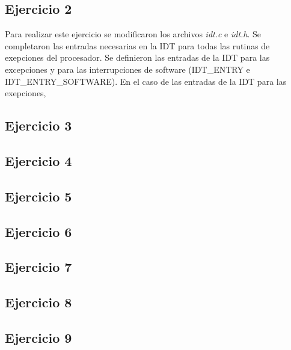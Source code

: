\documentclass[a4paper]{article}
\begin{document}

\subsection{Ejercicio 2}
\justify
Para realizar este ejercicio se modificaron los archivos \textit{idt.c} e \textit{idt.h}. Se completaron las entradas necesarias en la IDT para todas las rutinas de exepciones del procesador. Se definieron las entradas de la IDT para las excepciones y para las interrupciones de software (IDT_ENTRY e IDT_ENTRY_SOFTWARE). En el caso de las entradas de la IDT para las exepciones, 



\subsection{Ejercicio 3}
\subsection{Ejercicio 4}
\subsection{Ejercicio 5}
\subsection{Ejercicio 6}
\subsection{Ejercicio 7}
\subsection{Ejercicio 8}
\subsection{Ejercicio 9}
\end{document}
